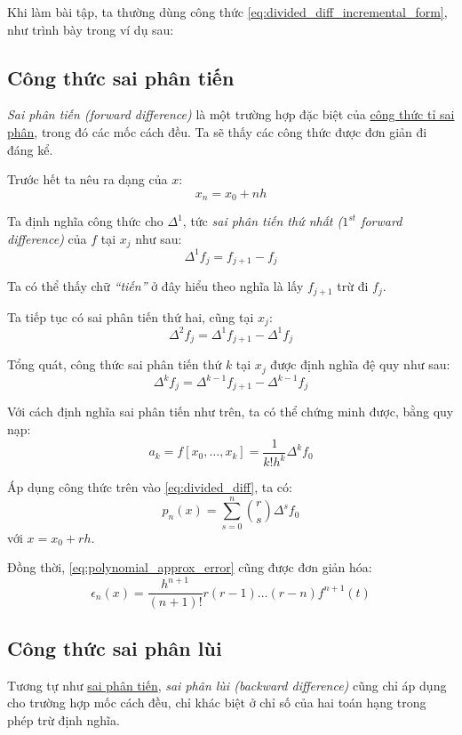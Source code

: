 \documentclass[../../Lectures]{subfiles}
\begin{document}
Khi làm bài tập, ta thường dùng công thức
\eqref{eq:divided_diff_incremental_form}, như trình bày trong ví dụ sau:


\subsection{Công thức sai phân tiến}

\emph{Sai phân tiến (forward difference)} là một trường hợp đặc biệt của
\hyperref[eq:divided_diff]{công thức tỉ sai phân}, trong đó các mốc cách
đều. Ta sẽ thấy các công thức được đơn giản đi đáng kể.

Trước hết ta nêu ra dạng của \(x\):
\[x_n = x_0 + nh\]

Ta định nghĩa công thức cho \(\Delta^1\), tức \emph{sai phân tiến thứ nhất
(\(1^{st}\) forward difference)} của \(f\) tại \(x_j\) như sau:
\[\Delta^1 f_j = f_{j + 1} - f_j\]

Ta có thể thấy chữ \emph{``tiến''} ở đây hiểu theo nghĩa là lấy \(f_{j + 1}\)
trừ đi \(f_j\).

Ta tiếp tục có sai phân tiến thứ hai, cũng tại \(x_j\):
\[\Delta^2 f_j = \Delta^1 f_{j + 1} - \Delta^1 f_j\]

Tổng quát, công thức sai phân tiến thứ \(k\) tại \(x_j\) được định nghĩa đệ quy
như sau:
\begin{equation}\label{eq:kth_forward_diff}
    \Delta^k f_j = \Delta^{k - 1} f_{j + 1} - \Delta^{k - 1} f_j
\end{equation}

Với cách định nghĩa sai phân tiến như trên, ta có thể chứng minh được, bằng quy
nạp:
\[a_k = f[x_0, \ldots, x_k] = \frac{1}{k! h^k} \Delta^k f_0\]

Áp dụng công thức trên vào \eqref{eq:divided_diff}, ta có:
\begin{equation}\label{eq:forward_diff_interpo}
    p_n(x) = \sum_{s = 0}^{n} \binom{r}{s} \Delta^s f_0
\end{equation}
với \(x = x_0 + rh\).

Đồng thời, \eqref{eq:polynomial_approx_error} cũng được đơn giản hóa:
\[\epsilon_n(x) = \frac{h^{n + 1}}{(n + 1)!} r(r - 1) \ldots (r - n) f^{n + 1}(t)\]

\subsection{Công thức sai phân lùi}

Tương tự như \hyperref[eq:kth_forward_diff]{sai phân tiến}, \emph{sai phân lùi
(backward difference)} cũng chỉ áp dụng cho trường hợp mốc cách đều, chỉ khác
biệt ở chỉ số của hai toán hạng trong phép trừ định nghĩa.
\end{document}
